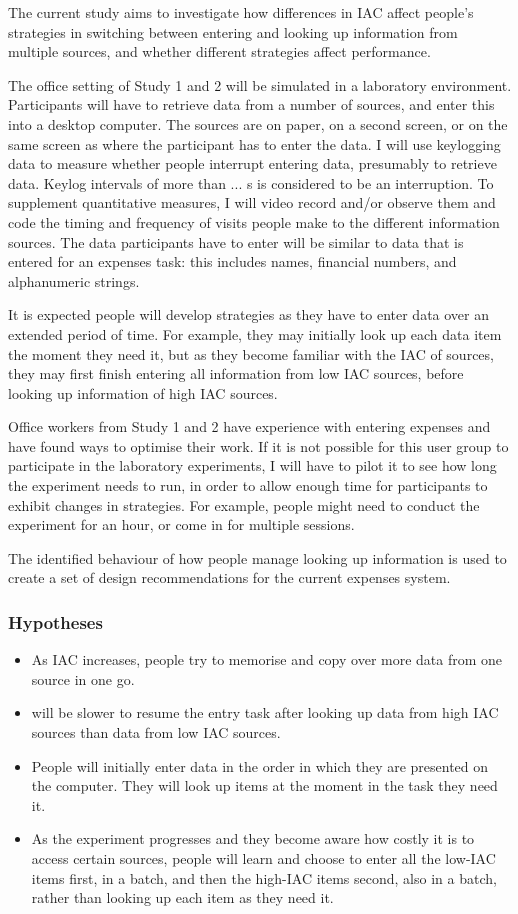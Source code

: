 \documentclass[11pt,oneside]{report}
\begin{document}
\begin{table}
The current study aims to investigate how differences in IAC affect people's strategies in switching between entering and looking up information from multiple sources, and whether different strategies affect performance.

The office setting of Study 1 and 2 will be simulated in a laboratory environment. Participants will have to retrieve data from a number of sources, and enter this into a desktop computer. The sources are on paper, on a second screen, or on the same screen as where the participant has to enter the data. I will use keylogging data to measure whether people interrupt entering data, presumably to retrieve data. Keylog intervals of more than ... s is considered to be an interruption. To supplement quantitative measures, I will video record and/or observe them and code the timing and frequency of visits people make to the different information sources.
The data participants have to enter will be similar to data that is entered for an expenses task: this includes names, financial numbers, and alphanumeric strings. 

It is expected people will develop strategies as they have to enter data over an extended period of time. 
For example, they may initially look up each data item the moment they need it, but as they become familiar with the IAC of sources, they may first finish entering all information from low IAC sources, before looking up information of high IAC sources. 

Office workers from Study 1 and 2 have experience with entering expenses and have found ways to optimise their work. If it is not possible for this user group to participate in the laboratory experiments, I will have to pilot it to see how long the experiment needs to run, in order to allow enough time for participants to exhibit changes in strategies. For example, people might need to conduct the experiment for an hour, or come in for multiple sessions.

The identified behaviour of how people manage looking up information is used to create a set of design recommendations for the current expenses system. 

\subsubsection{Hypotheses}
\begin{itemize}
\item
As IAC increases, people try to memorise and copy over more data from one source in one go.
\item 
 will be slower to resume the entry task after looking up data from high IAC sources than data from low IAC sources.
\item 
People will initially enter data in the order in which they are presented on the computer. They will look up items at the moment in the task they need it.
\item 
As the experiment progresses and they become aware how costly it is to access certain sources, people will learn and choose to enter all the low-IAC items first, in a batch, and then the high-IAC items second, also in a batch, rather than looking up each item as they need it. 
 

\end{itemize}
\end{table}
\end{document}
